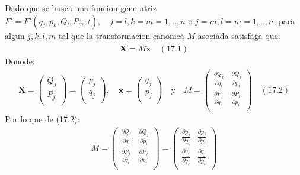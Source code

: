 \documentclass[a4paper]{article}
\begin{document}
    \begin{answer}[Punto 3]
        Dado que se busca una funcion generatriz $F'= F'(q_j, p_k,Q_l,P_m,t), \quad j=l,  k=m =1,..,n \text{ o }  j=m,  l=m =1,..,n$, para algun $j,k,l,m$ tal que la transformacion canonica $M$ asociada satisfaga que:
        \begin{align*}
            \mathbf{\dot X} = M \dot {\mathbf{x} }\quad (17.1)
        \end{align*}
        Donode:
        \begin{align*}
            \mathbf X = \begin{pmatrix}
                Q_j\\
                P_j\\
            \end{pmatrix} = \begin{pmatrix}
                p_j\\
                q_j\\
            \end{pmatrix},\quad \mathbf x = \begin{pmatrix}
                q_j\\
                p_j\\
            \end{pmatrix}
            \quad \text{y} \quad 
            M = \begin{pmatrix}
                \frac{\partial Q_j}{\partial q_i} & \frac{\partial Q_j}{\partial p_i}\\
                \frac{\partial P_j}{\partial q_i} & \frac{\partial P_j}{\partial p_i}\\
            \end{pmatrix}
            \quad (17.2)
        \end{align*}
        Por lo que de (17.2):
        \begin{align*}
            M = \begin{pmatrix}
                \frac{\partial Q_j}{\partial q_i} & \frac{\partial Q_j}{\partial p_i}\\
                \frac{\partial P_j}{\partial q_i} & \frac{\partial P_j}{\partial p_i}\\
            \end{pmatrix} = \begin{pmatrix}
                \frac{\partial p_j }{\partial q_i} & \frac{\partial p_j }{\partial p_i}\\
                \frac{\partial q_j }{\partial q_i} & \frac{\partial q_j }{\partial p_i}\\

\end{pmatrix}
\end{align*}
\end{answer}
\end{document}
